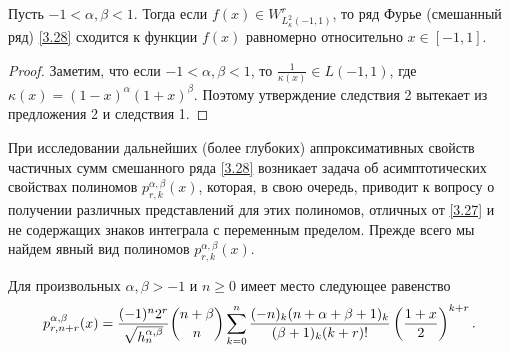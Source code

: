 \begin{corollary}
Пусть $-1<\alpha,\beta<1$. Тогда если $f(x)\in W^r_{L^2_\kappa(-1,1)}$, то ряд Фурье (смешанный ряд) \eqref{3.28} сходится к функции $f(x)$ равномерно относительно $x\in[-1,1]$.
\end{corollary}
\begin{proof}
Заметим, что если $-1<\alpha,\beta<1$, то $\frac{1}{\kappa(x)}\in L(-1,1)$, где $\kappa(x)=(1-x)^\alpha(1+x)^\beta$. Поэтому утверждение следствия 2 вытекает из предложения 2 и следствия 1.
\end{proof}

При исследовании дальнейших (более глубоких) аппроксимативных свойств частичных сумм смешанного ряда \eqref{3.28} возникает задача об асимптотических свойствах полиномов $p_{r,k}^{\alpha,\beta}(x)$, которая, в свою очередь, приводит к вопросу о получении различных представлений для этих полиномов, отличных от  \eqref{3.27} и не содержащих знаков интеграла с переменным пределом. Прежде всего мы найдем явный вид полиномов $p_{r,k}^{\alpha,\beta}(x)$.

\begin{theorem} Для произвольных $\alpha, \beta>-1$ и $n\ge0$
имеет место следующее равенство
\begin{equation}\label{3.30}
p_{r,n+r}^{\alpha,\beta}(x)=\frac{(-1)^n2^{r}}{\sqrt{ h_n^{\alpha,\beta}}}
{n+\beta\choose n}
\sum_{k=0}^n{(-n)_k(n+\alpha+\beta+1)_k\over (\beta+1)_k(k+r)!}
\left({1+x\over 2}\right)^{k+r}.
\end{equation}
\end{theorem}

